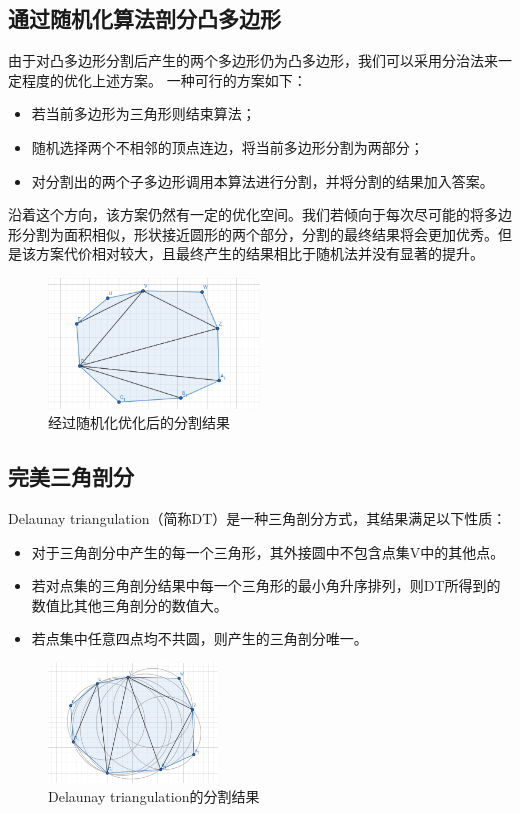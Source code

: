\subsection{通过随机化算法剖分凸多边形}

由于对凸多边形分割后产生的两个多边形仍为凸多边形，我们可以采用分治法来一定程度的优化上述方案。
一种可行的方案如下：
\begin{itemize}
    \item 若当前多边形为三角形则结束算法；
    \item 随机选择两个不相邻的顶点连边，将当前多边形分割为两部分；
    \item 对分割出的两个子多边形调用本算法进行分割，并将分割的结果加入答案。
\end{itemize}

沿着这个方向，该方案仍然有一定的优化空间。我们若倾向于每次尽可能的将多边形分割为面积相似，形状接近圆形的两个部分，分割的最终结果将会更加优秀。但是该方案代价相对较大，且最终产生的结果相比于随机法并没有显著的提升。

\begin{figure}[htp]
    \centering
    \includegraphics[width=0.5\textwidth]
    {figures/random.png}
    \caption{经过随机化优化后的分割结果}
  \end{figure}

\subsection{完美三角剖分}
Delaunay triangulation（简称DT）是一种三角剖分方式，其结果满足以下性质：
\begin{itemize}
    \item 对于三角剖分中产生的每一个三角形，其外接圆中不包含点集V中的其他点。
    \item 若对点集的三角剖分结果中每一个三角形的最小角升序排列，则DT所得到的数值比其他三角剖分的数值大。
    \item 若点集中任意四点均不共圆，则产生的三角剖分唯一。
\end{itemize}

\begin{figure}[htbp]
    \centering
    \includegraphics[width=0.4\textwidth]
    {figures/triangulation-1.png}
    \caption{Delaunay triangulation的分割结果}
\end{figure}

